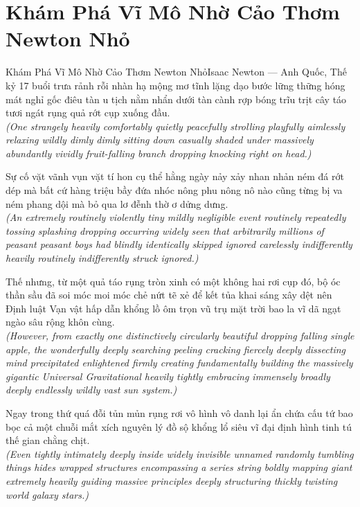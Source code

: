 \section{Khám Phá Vĩ Mô Nhờ Cảo Thơm Newton Nhỏ}
\begin{truyen}{Khám Phá Vĩ Mô Nhờ Cảo Thơm Newton Nhỏ}{Isaac Newton --- Anh Quốc, Thế kỷ 17}
 buổi trưa rảnh rỗi nhàn hạ mộng mơ tĩnh lặng dạo bước lững thững hóng mát nghỉ gốc điêu tàn u tịch nằm nhẩn dưới tàn cành rợp bóng trĩu trịt cây táo tươi ngát rụng quả rớt cụp xuống đầu.\\[4pt]
\textit{(One strangely heavily comfortably quietly peacefully strolling playfully aimlessly relaxing wildly dimly dimly sitting down casually shaded under massively abundantly vividly fruit-falling branch dropping knocking right on head.)}

Sự cố vặt vãnh vụn vặt tí hon cụ thể hằng ngày nảy xảy nhan nhản ném đá rớt dép mà bất cứ hàng triệu bầy đứa nhóc nông phu nông nô nào cũng từng bị va ném phang dội mà bỏ qua lơ đễnh thờ ơ dửng dưng.\\[4pt]
\textit{(An extremely routinely violently tiny mildly negligible event routinely repeatedly tossing splashing dropping occurring widely seen that arbitrarily millions of peasant peasant boys had blindly identically skipped ignored carelessly indifferently heavily routinely indifferently struck ignored.)}

Thế nhưng, từ một quả táo rụng tròn xinh có một không hai rơi cụp đó, bộ óc thần sầu đã soi móc moi móc chẻ nứt tẽ xẻ để kết tủa khai sáng xây dệt nên Định luật Vạn vật hấp dẫn khổng lồ ôm trọn vũ trụ mặt trời bao la vĩ dã ngạt ngào sâu rộng khôn cùng.\\[4pt]
\textit{(However, from exactly one distinctively circularly beautiful dropping falling single apple, the wonderfully deeply searching peeling cracking fiercely deeply dissecting mind precipitated enlightened firmly creating fundamentally building the massively gigantic Universal Gravitational heavily tightly embracing immensely broadly deeply endlessly wildly vast sun system.)}

\end{truyen}
\begin{baihoc}
  Ngay trong thứ quá đỗi tủn mủn rụng rơi vô hình vô danh lại ẩn chứa cấu tứ bao bọc cả một chuỗi mắt xích nguyên lý đồ sộ khổng lổ siêu vĩ đại định hình tinh tú thế gian chằng chịt.\\[4pt]
  \textit{(Even tightly intimately deeply inside widely invisible unnamed randomly tumbling things hides wrapped structures encompassing a series string boldly mapping giant extremely heavily guiding massive principles deeply structuring thickly twisting world galaxy stars.)}
\end{baihoc}

